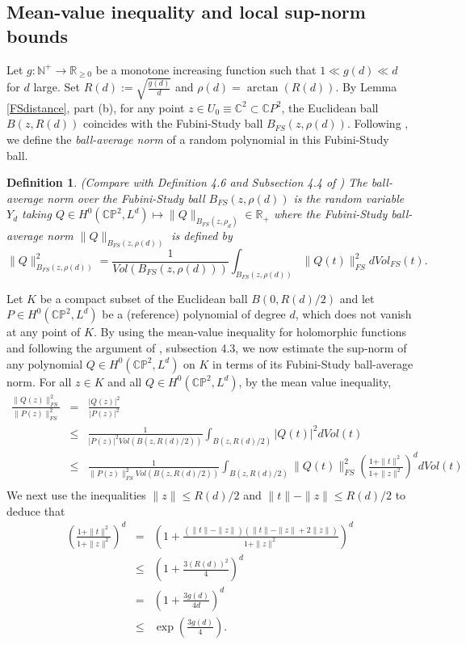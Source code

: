 \documentclass [11pt]{amsart}
\newtheorem {definition}[theorem]{Definition}
\theoremstyle{remark}
\numberwithin{equation}{section}
\numberwithin{theorem}{section}
\begin{document}
\subsection{Mean-value inequality and local sup-norm bounds} \label{meanvalue}
Let $g:\mathbb{N^{+}}\rightarrow \mathbb{R}_{\geq 0}$ be a monotone increasing function such that $1 \ll g(d)\ll d$ for $d$ large. Set $\displaystyle{R(d):=\sqrt{\frac{g(d)}{d}}}$ and $\displaystyle{\rho(d)=\arctan\left(R(d)\right)}$. By Lemma \ref{FSdistance}, part (b), for any point $z\in U_{0}\equiv \mathbb{C}^{2}\subset \mathbb{C}P^2$, the Euclidean ball $\displaystyle{B\left(z,R(d)\right)}$ coincides with the Fubini-Study ball $B_{FS}(z,\rho(d))$. Following \cite{KW}, we define the {\it ball-average norm} of a random polynomial in this Fubini-Study ball. 

\begin{definition} \label{ballaverage}
(Compare with  Definition 4.6 and Subsection 4.4 of \cite{KW}) The ball-average norm over the Fubini-Study ball $B_{FS}(z,\rho(d))$ is the random variable $Y_{d}$ taking $Q\in H^{0}(\mathbb{CP}^2,L^d)\mapsto \|Q\|_{B_{FS}(z,\rho_{d})}\in \mathbb{R}_{+}$
where the Fubini-Study ball-average norm $\|Q\|_{B_{FS}(z,\rho(d))}$ is defined by
\[  \|Q\|^2_{B_{FS}(z,\rho(d))}=\frac{1}{Vol(B_{FS}(z,\rho(d)))} \int_{B_{FS}(z,\rho(d))} \|Q(t)\|_{FS}^2 dVol_{FS}(t). \]     
\end{definition} 

Let $K$ be a compact subset of the Euclidean ball $\displaystyle{B\left(0,R(d)/2\right)}$ and let $P\in H^{0}(\mathbb{CP}^2,L^d)$ be a (reference) polynomial of degree $d$, which does not vanish at any point of $K$. By using the mean-value inequality for holomorphic functions and following the argument of \cite{KW}, subsection 4.3, we now estimate the sup-norm of any polynomial $Q\in H^{0}(\mathbb{CP}^2,L^d)$ on $K$ in terms of its Fubini-Study ball-average norm. For all $z\in K$ and all $Q\in H^{0}(\mathbb{CP}^2,L^d)$, by the mean value inequality,
\begin{eqnarray*}
\frac{ \|Q(z)\|_{FS}^2}{\|P(z)\|_{FS}^2} &=& \frac{ |Q(z)|^2}{|P(z)|^2} \\
&\leq& \frac{1}{|P(z)|^2 Vol\left(B\left(z,R(d)/2\right)\right)} \int_{B\left(z,R(d)/2\right)}  |Q(t)|^2dVol(t) \\ 
&\leq& \frac{1}{\|P(z)\|_{FS}^2 Vol\left(B\left(z,R(d)/2\right)\right)} \int_{B\left(z,R(d)/2\right)}  \|Q(t)\|_{FS}^2 \left( \frac{1+\|t\|^2}{1+\|z\|^2}\right)^{d}dVol(t) \\ 
\end{eqnarray*}
We next use the inequalities $\displaystyle{ \|z\|\leq R(d)/2}$ and $\displaystyle{\|t\|-\|z\|\leq R(d)/2}$ to deduce that 
\begin{eqnarray*} 
 \left( \frac{1+\|t\|^2}{1+\|z\|^2}\right)^{d} &=& \left( 1+ \frac{(\|t\|-\|z\|)(\|t\|-\|z\|+2\|z\|)}{1+\|z\|^2}\right)^{d} \\
&\leq& \left( 1+\frac{3(R(d))^2}{4}\right)^{d}  \\ 
&=& \left( 1+\frac{3g(d)}{4d}\right)^{d}  \\  
&\leq& \exp\left(\frac{3g(d)}{4}\right). 
\end{eqnarray*} 
\end{document}
